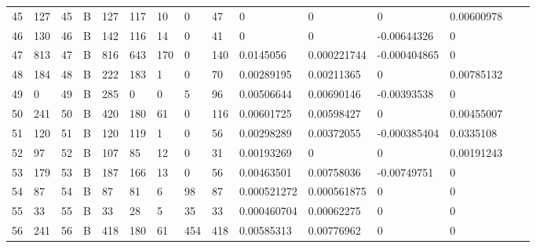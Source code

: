 \begin{longtable}{lllllllllllllll}
	45  & 127               & 45  & B   & 127               & 117               & 10                & 0    & 47         & 0              & 0              & 0             & 0.00600978   \\
	46  & 130               & 46  & B   & 142               & 116               & 14                & 0    & 41         & 0              & 0              & -0.00644326   & 0            \\
	47  & 813               & 47  & B   & 816               & 643               & 170               & 0    & 140        & 0.0145056      & 0.000221744    & -0.000404865  & 0            \\
	48  & 184               & 48  & B   & 222               & 183               & 1                 & 0    & 70         & 0.00289195     & 0.00211365     & 0             & 0.00785132   \\
	49  & 0                 & 49  & B   & 285               & 0                 & 0                 & 5    & 96         & 0.00506644     & 0.00690146     & -0.00393538   & 0            \\
	50  & 241               & 50  & B   & 420               & 180               & 61                & 0    & 116        & 0.00601725     & 0.00598427     & 0             & 0.00455007   \\
	51  & 120               & 51  & B   & 120               & 119               & 1                 & 0    & 56         & 0.00298289     & 0.00372055     & -0.000385404  & 0.0335108    \\
	52  & 97                & 52  & B   & 107               & 85                & 12                & 0    & 31         & 0.00193269     & 0              & 0             & 0.00191243   \\
	53  & 179               & 53  & B   & 187               & 166               & 13                & 0    & 56         & 0.00463501     & 0.00758036     & -0.00749751   & 0            \\
	54  & 87                & 54  & B   & 87                & 81                & 6                 & 98   & 87         & 0.000521272    & 0.000561875    & 0             & 0            \\
	55  & 33                & 55  & B   & 33                & 28                & 5                 & 35   & 33         & 0.000460704    & 0.00062275     & 0             & 0            \\
	56  & 241               & 56  & B   & 418               & 180               & 61                & 454  & 418        & 0.00585313     & 0.00776962     & 0             & 0            \\

\end{longtable}
